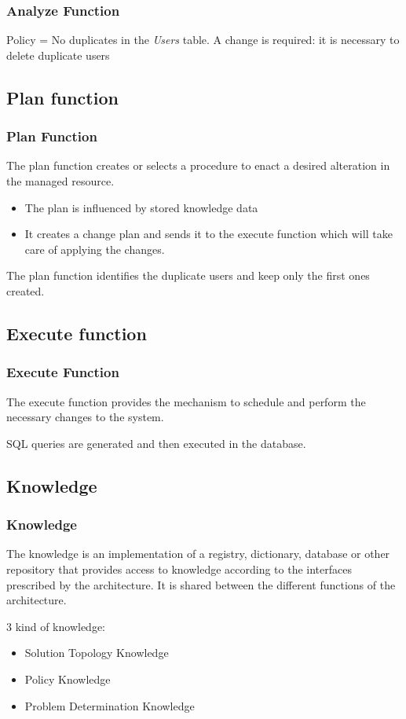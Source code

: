 \documentclass[11pt]{beamer}
\begin{document}
\begin{frame}
\frametitle{Analyze Function}
\begin{example}
Policy = No duplicates in the \textit{Users} table.
A change is required: it is necessary to delete duplicate users
\end{example}
\end{frame}

    \subsection{Plan function}

\begin{frame}
\frametitle{Plan Function}
The plan function creates or selects a procedure to enact a desired alteration
in the managed resource.
\begin{itemize}
\item The plan is influenced by stored knowledge data
\item It creates a change plan and sends it to the execute function which will take care of applying the changes.
\end{itemize}
\begin{example}
The plan function identifies the duplicate users and keep only the first ones created. 
\end{example}
\end{frame}

    \subsection{Execute function}
\begin{frame}
\frametitle{Execute Function}
The execute function provides the mechanism to schedule and perform the
necessary changes to the system. \newline
\begin{example}
SQL queries are generated and then executed in the database.
\end{example}
\end{frame}
    
    \subsection{Knowledge}
\begin{frame}
\frametitle{Knowledge}
\begin{definition}
The knowledge is an implementation of a registry, dictionary,
database or other repository that provides access to knowledge according
to the interfaces prescribed by the architecture. It is shared between the different functions of the architecture.
\end{definition}
3 kind of knowledge:
\begin{itemize}
\item Solution Topology Knowledge
\item Policy Knowledge
\item Problem Determination Knowledge
\end{itemize}
\end{frame}
\end{document}
